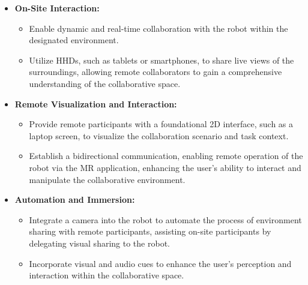 \begin{itemize}
    \item \textbf{On-Site Interaction:}
    \begin{itemize}
        \item Enable dynamic and real-time collaboration with the robot within the designated environment.
        \item Utilize \ac{HHDs}, such as tablets or smartphones, to share live views of the surroundings, allowing remote collaborators 
        to gain a comprehensive understanding of the collaborative space.
    \end{itemize}
    \item \textbf{Remote Visualization and Interaction:}
    \begin{itemize}
        \item Provide remote participants with a foundational 2D interface, such as a laptop screen, to visualize the collaboration scenario and 
        task context.
        \item Establish a bidirectional communication, enabling remote operation of the robot via the \ac{MR} application, enhancing the user's ability to interact and manipulate the collaborative environment.
    \end{itemize}
    \item \textbf{Automation and Immersion:}
    \begin{itemize}
        \item Integrate a camera into the robot to automate the process of environment sharing with remote participants, assisting on-site participants 
        by delegating visual sharing to the robot.
        \item Incorporate visual and audio cues to enhance the user's perception and interaction within the collaborative space.
    \end{itemize}
\end{itemize}

